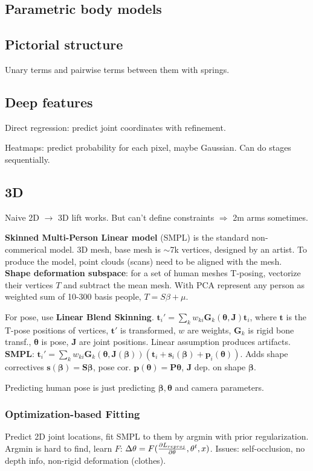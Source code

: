 \documentclass[11pt,landscape,a4paper,fleqn]{article}
\def\myvector#1{\mathbf{#1}}
\def\vp{{\myvector{p}}}
\def\vs{{\myvector{s}}}
\def\vt{{\myvector{t}}}
\def\mymatrix#1{\mathbf{#1}}
\def\mG{{\mymatrix{G}}}
\def\mJ{{\mymatrix{J}}}
\def\mP{{\mymatrix{P}}}
\def\mS{{\mymatrix{S}}}
\begin{document}
\begin{multicols*}{4}
\section{Parametric body models}

\subsection{Pictorial structure}

Unary terms and pairwise terms between them with springs.

\subsection{Deep features}

Direct regression: predict joint coordinates with refinement.

Heatmaps: predict probability for each pixel, maybe Gaussian.
Can do stages sequentially.

\subsection{3D}

Naive 2D $\to$ 3D lift works.
But can't define constraints $ \Rightarrow $ 2m arms sometimes.

\textbf{Skinned Multi-Person Linear model} (SMPL) is the standard non-commerical model.
3D mesh, base mesh is $\sim$7k vertices, designed by an artist.
To produce the model, point clouds (scans) need to be aligned with the mesh.
\textbf{Shape deformation subspace}: for a set of human meshes T-posing,
vectorize their vertices $T$ and subtract the mean mesh.
With PCA represent any person as weighted sum of 10-300 basis people, $T = S\beta + \mu$.

For pose, use \textbf{Linear Blend Skinning}.
$\vt_i' = \sum_k w_{ki} \mG_k(\bm\theta, \mJ)\vt_i$,
where $\vt$ is the T-pose positions of vertices,
$\vt'$ is transformed, $w$ are weights,
$\mG_k$ is rigid bone transf.,
$\bm\theta$ is pose, $\mJ$ are joint positions.
Linear assumption produces artifacts.
\textbf{SMPL}:
$\vt_i' = \sum_k w_{ki} \mG_k(\bm\theta, \mJ(\bm\beta))(\vt_i + \vs_i(\bm\beta) + \vp_i(\bm\theta))$.
Adds shape correctives $\vs(\bm\beta) = \mS\bm\beta$,
pose cor. $\vp(\bm\theta) = \mP\bm\theta$,
$\mJ$ dep. on shape $\bm\beta$.

Predicting human pose is just predicting $\bm\beta, \bm\theta$ and camera parameters.

\subsubsection{Optimization-based Fitting} Predict 2D joint locations,
fit SMPL to them by argmin with prior regularization.
Argmin is hard to find, learn $F$: $\Delta \theta = F(\pdv{L_{reproj}}{\theta}, \theta^t, x)$.
Issues: self-occlusion, no depth info, non-rigid deformation (clothes).


\end{multicols*}
\end{document}

